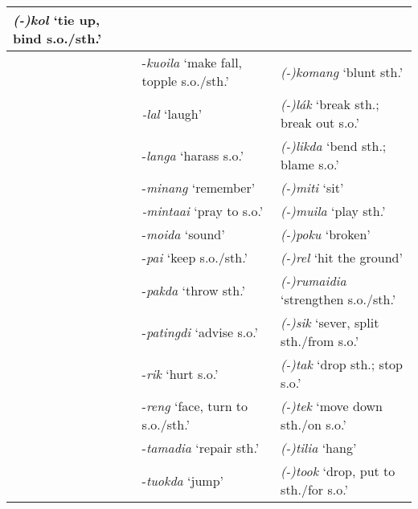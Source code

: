 \begin{flushleft}
\begin{supertabular}{|m{0.6011598in}|m{2.7900598in}|m{2.79136in}|}
\textit{(-)}\textit{kol} {\textquoteleft}tie up, bind s.o./sth.{\textquoteright}\\\hline
 &
{}-\textit{kuoila} {\textquoteleft}make fall, topple s.o./sth.{\textquoteright} &
\textit{(-)}\textit{komang} {\textquoteleft}blunt sth.{\textquoteright}\\\hline
 &
\textit{{}-lal} {\textquoteleft}laugh{\textquoteright} &
\textit{(-)}\textit{l\'ak} {\textquoteleft}break sth.; break out s.o.{\textquoteright}\\\hline
 &
{}-\textit{langa} {\textquoteleft}harass s.o.{\textquoteright} &
\textit{(-)}\textit{likda} {\textquoteleft}bend sth.; blame s.o.{\textquoteright}\\\hline
 &
{}-\textit{minang} {\textquoteleft}remember{\textquoteright}  &
\textit{(-)}\textit{miti} {\textquoteleft}sit{\textquoteright}\\\hline
 &
\textit{{}-mintaai} {\textquoteleft}pray to s.o.{\textquoteright} &
\textit{(-)}\textit{muila} {\textquoteleft}play sth.{\textquoteright}\\\hline
 &
{}-\textit{moida} {\textquoteleft}sound{\textquoteright} &
\textit{(-)}\textit{poku} {\textquoteleft}broken{\textquoteright}\\\hline
 &
{}-\textit{pai} {\textquoteleft}keep s.o./sth.{\textquoteright} &
\textit{(-)}\textit{rel} {\textquoteleft}hit the ground{\textquoteright}\\\hline
 &
{}-\textit{pakda} {\textquoteleft}throw sth.{\textquoteright} &
\textit{(-)}\textit{rumaidia} {\textquoteleft}strengthen s.o./sth.{\textquoteright}\\\hline
 &
{}-\textit{patingdi} {\textquoteleft}advise s.o.{\textquoteright} &
\textit{(-)}\textit{sik} {\textquoteleft}sever, split sth./from s.o.{\textquoteright}\\\hline
 &
{}-\textit{rik} {\textquoteleft}hurt s.o.{\textquoteright} &
\textit{(-)}\textit{tak} {\textquoteleft}drop sth.; stop s.o.{\textquoteright}\\\hline
 &
{}-\textit{reng} {\textquoteleft}face, turn to s.o./sth.{\textquoteright} &
\textit{(-)}\textit{tek} {\textquoteleft}move down sth./on s.o.{\textquoteright}\\\hline
 &
{}-\textit{tamadia} {\textquoteleft}repair sth.{\textquoteright} &
\textit{(-)}\textit{tilia }{\textquoteleft}hang{\textquoteright}\\\hline
 &
{}-\textit{tuokda} {\textquoteleft}jump{\textquoteright} &
\textit{(-)}\textit{took }{\textquoteleft}drop, put to sth./for s.o.{\textquoteright}\\\hline

\end{supertabular}
\end{flushleft}
